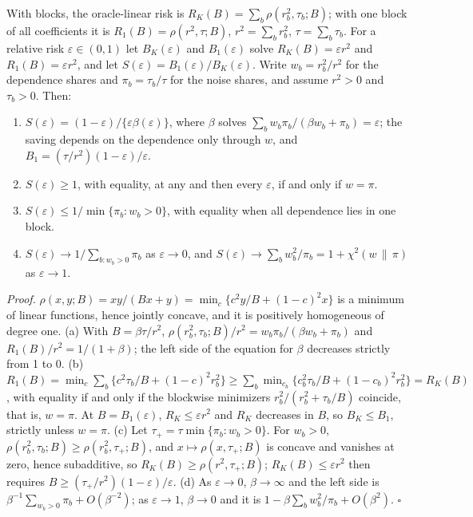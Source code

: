 \begin{proposition}\label{prop:law}
With blocks, the oracle-linear risk is $R_K(B)=\sum_b\rho(r_b^2,\tau_b;B)$; with one block of all coefficients it is $R_1(B)=\rho(r^2,\tau;B)$, $r^2=\sum_br_b^2$, $\tau=\sum_b\tau_b$. For a relative risk $\varepsilon\in(0,1)$ let $B_K(\varepsilon)$ and $B_1(\varepsilon)$ solve $R_K(B)=\varepsilon r^2$ and $R_1(B)=\varepsilon r^2$, and let $S(\varepsilon)=B_1(\varepsilon)/B_K(\varepsilon)$. Write $w_b=r_b^2/r^2$ for the dependence shares and $\pi_b=\tau_b/\tau$ for the noise shares, and assume $r^2>0$ and $\tau_b>0$. Then:
\begin{enumerate}
\item[(a)] $S(\varepsilon)=(1-\varepsilon)/\{\varepsilon\beta(\varepsilon)\}$, where $\beta$ solves $\sum_bw_b\pi_b/(\beta w_b+\pi_b)=\varepsilon$; the saving depends on the dependence only through $w$, and $B_1=(\tau/r^2)(1-\varepsilon)/\varepsilon$.
\item[(b)] $S(\varepsilon)\ge1$, with equality, at any and then every $\varepsilon$, if and only if $w=\pi$.
\item[(c)] $S(\varepsilon)\le1/\min\{\pi_b:w_b>0\}$, with equality when all dependence lies in one block.
\item[(d)] $S(\varepsilon)\to1/\sum_{b:w_b>0}\pi_b$ as $\varepsilon\to0$, and $S(\varepsilon)\to\sum_bw_b^2/\pi_b=1+\chi^2(w\,\|\,\pi)$ as $\varepsilon\to1$.
\end{enumerate}
\end{proposition}
\noindent\textit{Proof.} $\rho(x,y;B)=xy/(Bx+y)=\min_c\{c^2y/B+(1-c)^2x\}$ is a minimum of linear functions, hence jointly concave, and it is positively homogeneous of degree one. (a) With $B=\beta\tau/r^2$, $\rho(r_b^2,\tau_b;B)/r^2=w_b\pi_b/(\beta w_b+\pi_b)$ and $R_1(B)/r^2=1/(1+\beta)$; the left side of the equation for $\beta$ decreases strictly from 1 to 0. (b) $R_1(B)=\min_c\sum_b\{c^2\tau_b/B+(1-c)^2r_b^2\}\ge\sum_b\min_{c_b}\{c_b^2\tau_b/B+(1-c_b)^2r_b^2\}=R_K(B)$, with equality if and only if the blockwise minimizers $r_b^2/(r_b^2+\tau_b/B)$ coincide, that is, $w=\pi$. At $B=B_1(\varepsilon)$, $R_K\le\varepsilon r^2$ and $R_K$ decreases in $B$, so $B_K\le B_1$, strictly unless $w=\pi$. (c) Let $\tau_+=\tau\min\{\pi_b:w_b>0\}$. For $w_b>0$, $\rho(r_b^2,\tau_b;B)\ge\rho(r_b^2,\tau_+;B)$, and $x\mapsto\rho(x,\tau_+;B)$ is concave and vanishes at zero, hence subadditive, so $R_K(B)\ge\rho(r^2,\tau_+;B)$; $R_K(B)\le\varepsilon r^2$ then requires $B\ge(\tau_+/r^2)(1-\varepsilon)/\varepsilon$. (d) As $\varepsilon\to0$, $\beta\to\infty$ and the left side is $\beta^{-1}\sum_{w_b>0}\pi_b+O(\beta^{-2})$; as $\varepsilon\to1$, $\beta\to0$ and it is $1-\beta\sum_bw_b^2/\pi_b+O(\beta^2)$. $\square$

